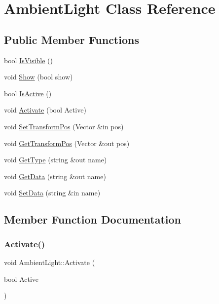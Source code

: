 \hypertarget{class_ambient_light}{}\section{Ambient\+Light Class Reference}
\label{class_ambient_light}
\subsection*{Public Member Functions}
\begin{DoxyCompactItemize}
\item 
bool \hyperlink{class_ambient_light_a16bfc3c9bdb559895f1ed7d4bd047032}{Is\+Visible} ()
\item 
void \hyperlink{class_ambient_light_a18bb78895b77974c8d95abd05c0abba1}{Show} (bool show)
\item 
bool \hyperlink{class_ambient_light_a3edb529d1adde69104ca30724f55f3ca}{Is\+Active} ()
\item 
void \hyperlink{class_ambient_light_a275e6b5bb85273954d507f172cf0ef9b}{Activate} (bool Active)
\item 
void \hyperlink{class_ambient_light_ab8a292194dff1d0c744c40a2c72d6704}{Set\+Transform\+Pos} (Vector \&in pos)
\item 
void \hyperlink{class_ambient_light_a1b393744bae63464d6f105f915a011b4}{Get\+Transform\+Pos} (Vector \&out pos)
\item 
void \hyperlink{class_ambient_light_a9de05c7b1c46ed7a1474e212aa89712d}{Get\+Type} (string \&out name)
\item 
void \hyperlink{class_ambient_light_a6154ec53922a92ec489b5c61f812d5db}{Get\+Data} (string \&out name)
\item 
void \hyperlink{class_ambient_light_a82e62f3b145c061ee322643e5a6a9b2e}{Set\+Data} (string \&in name)
\end{DoxyCompactItemize}


\subsection{Member Function Documentation}
\hypertarget{class_ambient_light_a275e6b5bb85273954d507f172cf0ef9b}{}\label{class_ambient_light_a275e6b5bb85273954d507f172cf0ef9b} 
\subsubsection{\texorpdfstring{Activate()}{Activate()}}
{\footnotesize\ttfamily void Ambient\+Light\+::\+Activate (\begin{DoxyParamCaption}\item[{bool}]{Active }\end{DoxyParamCaption})}

